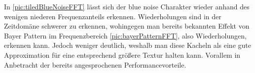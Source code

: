 In \ref{pic:tiledBlueNoiseFFT} lässt sich der blue noise Charakter wieder anhand des
wenigen niederen Frequenzanteils erkennen. Wiederholungen sind in der Zeitdomäne schwerer zu erkennen,
wohingegen man bereits bekannten Effekt von Bayer Pattern im Frequenzbereich \ref{pic:bayerPatternFFT}, also Wiederholungen,
erkennen kann. Jedoch weniger deutlich, weshalb man diese Kacheln als eine gute Approximation für eine
entsprechend größere Textur halten kann. Vorallem in Anbetracht der bereits angesprochenen 
Performancevorteile.
